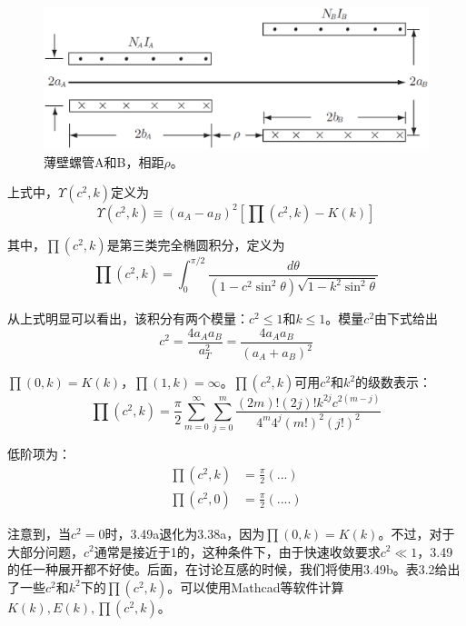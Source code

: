 \begin{figure}[htbp]
  \centering
 \includegraphics[scale=0.4]{chpt3/figs/fig3.7.eps}
  \caption{薄壁螺管A和B，相距$\rho$。}
\end{figure}

上式中，$\Upsilon(c^2,k)$定义为
\begin{equation}
  \Upsilon(c^2,k)\equiv(a_A-a_B)^2[\prod(c^2,k)-K(k)]
\end{equation}

其中，$\prod(c^2,k)$是第三类完全椭圆积分，定义为
\begin{equation}
\prod(c^2,k)=\int_{0}^{\pi/2}\frac{d\theta}{(1-c^2\sin^2\theta)\sqrt{1-k^2\sin^2\theta}}
\end{equation}

从上式明显可以看出，该积分有两个模量：$c^2\le 1$和$k\le 1$。模量$c^2$由下式给出
\begin{equation}
c^2=\frac{4a_A a_B}{a_T^2}=\frac{4a_A a_B}{(a_A+a_B)^2}
\end{equation}

$\prod(0,k)=K(k)$，$\prod(1,k)=\infty$。$\prod(c^2,k)$可用$c^2$和$k^2$的级数表示：
\begin{equation}
\prod(c^2,k)=\frac{\pi}{2}\sum_{m=0}^{\infty} \sum_{j=0}^{m} \frac{(2m)!(2j)!k^{2j}c^{2(m-j)}}{4^m 4^j (m!)^2(j!)^2}
\end{equation}

低阶项为：
\begin{subequations}
	\begin{align}
\prod(c^2,k) &= \frac{\pi}{2}(...) \\ 
\prod(c^2,0) &= \frac{\pi}{2}(....)
	\end{align}
\end{subequations}

注意到，当$c^2=0$时，3.49a退化为3.38a，因为$\prod(0,k)=K(k)$。不过，对于大部分问题，$c^2$通常是接近于1的，这种条件下，由于快速收敛要求$c^2\ll 1$，3.49的任一种展开都不好使。后面，在讨论互感的时候，我们将使用3.49b。表3.2给出了一些$c^2$和$k^2$下的$\prod(c^2,k)$。可以使用Mathcad等软件计算$K(k),E(k),\prod(c^2,k)$。

